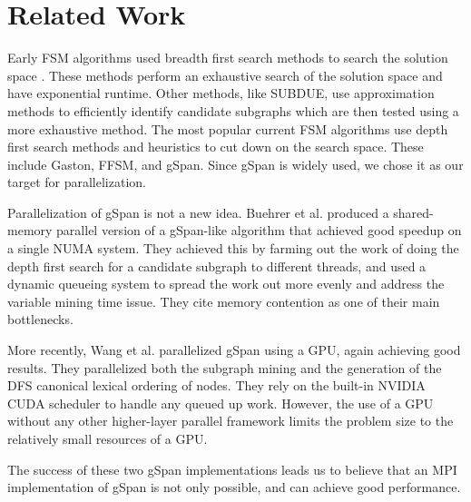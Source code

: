 \section{Related Work}
\label{sec:related}

Early FSM algorithms used breadth first search methods to search the
solution space \cite{AGM}\cite{FSG}.  These methods perform an exhaustive
search of the solution space and have exponential runtime.  Other methods, 
like SUBDUE\cite{subdue}, use approximation methods to efficiently 
identify candidate subgraphs which are then tested using a more exhaustive
method. The most popular current FSM algorithms use depth first search 
methods and heuristics to cut down on the search space. These include
Gaston\cite{gaston}, FFSM\cite{ffsm}, and gSpan\cite{gspan}.  Since
gSpan is widely used, we chose it as our target for parallelization.

Parallelization of gSpan is not a new idea. 
Buehrer et al. produced a shared-memory
parallel version of a gSpan-like algorithm that achieved good speedup on a 
single NUMA system\cite{buehrer2005parallel}.  They achieved this by 
farming out the work of doing the depth first search for a candidate 
subgraph to different threads, and used a dynamic queueing 
system to spread the work out more evenly and address the variable
mining time issue.  They cite memory contention as one of their main 
bottlenecks.

More recently, Wang et al. parallelized gSpan using a 
GPU\cite{gspancuda}, again achieving good results.  They parallelized both
the subgraph mining and the generation of the DFS canonical lexical 
ordering of nodes.  They rely on the built-in NVIDIA CUDA scheduler to handle
any queued up work. However, the use of a GPU without any other higher-layer 
parallel framework limits the problem size to the relatively small resources 
of a GPU. 

The success of these two gSpan implementations leads us to believe that an
MPI implementation of gSpan is not only possible, and can achieve good 
performance.
